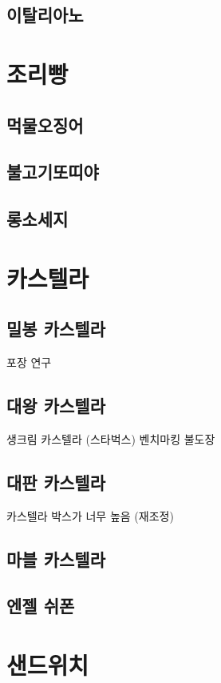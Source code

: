\documentclass{myproc}
\begin{document}
\subsection{\textcolor{blue2}{이탈리아노}}

\section{\textcolor{red2}{조리빵}}
\subsection{\textcolor{blue2}{먹물오징어}}
\subsection{\textcolor{blue2}{불고기또띠야}}
\subsection{\textcolor{blue2}{롱소세지}}

\section{\textcolor{red2}{카스텔라}}
\subsection{\textcolor{blue2}{밀봉 카스텔라}}
\bit
\w 포장 연구
\eit

\subsection{\textcolor{blue2}{대왕 카스텔라}}
\bit
\w 생크림 카스텔라 (스타벅스) 벤치마킹
\w 불도장
\eit

\subsection{\textcolor{blue2}{대판 카스텔라}}
\bit
\w 카스텔라 박스가 너무 높음 (재조정)
\eit
\subsection{\textcolor{blue2}{마블 카스텔라}}
\subsection{\textcolor{blue2}{엔젤 쉬폰}}


\section{\textcolor{red2}{샌드위치}}
\end{document}
